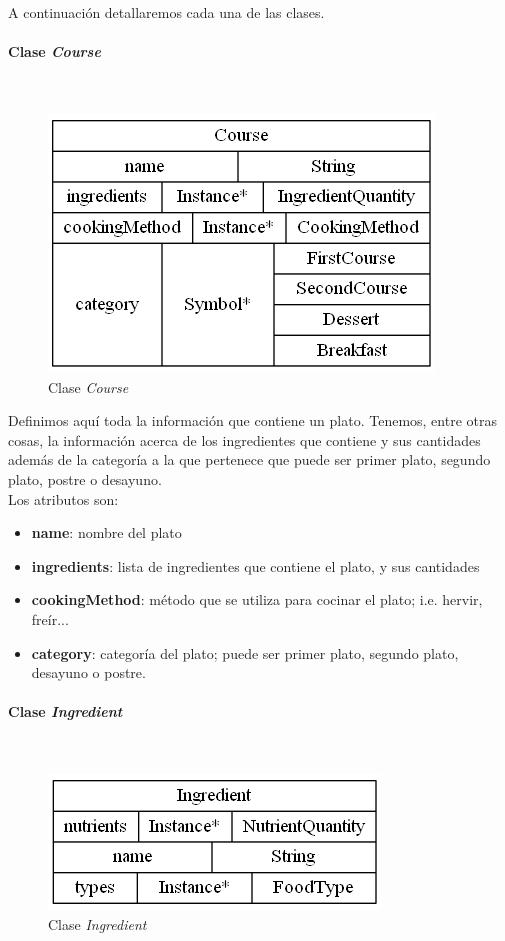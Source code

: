 \documentclass[12]{article}
\begin{document}
\vspace{0.5cm}

A continuación detallaremos cada una de las clases.

\paragraph{Clase \emph{Course}}\mbox{}\\
\begin{figure}[H]
\centering
\includegraphics[scale=0.5]{images/class_Course.png}
\caption{Clase \emph{Course}}
\label{fig_class_Course}
\end{figure}

Definimos aquí toda la información que contiene un plato. Tenemos, entre otras cosas, la información acerca de los ingredientes que contiene y sus cantidades además de la categoría a la que pertenece que puede ser primer plato, segundo plato, postre o desayuno.
\\

Los atributos son:
\begin{itemize}
\item \textbf{name}: nombre del plato
\item \textbf{ingredients}: lista de ingredientes que contiene el plato, y sus cantidades
\item \textbf{cookingMethod}: método que se utiliza para cocinar el plato; i.e. hervir, freír...
\item \textbf{category}: categoría del plato; puede ser primer plato, segundo plato, desayuno o postre. 
\end{itemize}


\vspace{0.5cm}

\paragraph{Clase \emph{Ingredient}}\mbox{}\\
\begin{figure}[H]
\centering
\includegraphics[scale=0.5]{images/class_Ingredient.png}
\caption{Clase \emph{Ingredient}}
\label{fig_class_Ingredient}
\end{figure}
\end{document}
